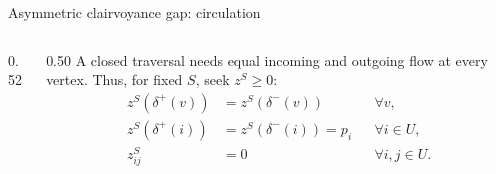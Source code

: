 \documentclass[aspectratio=169,12pt]{beamer}
\begin{document}
\begin{frame}{Asymmetric clairvoyance gap: circulation}
  \begin{columns}[c,onlytextwidth]
    \begin{column}{0.52\textwidth}
      \centering
      \resizebox{0.82\linewidth}{!}{\ThCirculationRelaxation}
    \end{column}
    \begin{column}{0.50\textwidth}
      \footnotesize
      A closed traversal needs equal incoming and outgoing flow at every
      vertex. Thus, for fixed \(S\), seek \(z^S\ge0\):
      \[
        \begin{aligned}
          z^S(\delta^+(v))&=z^S(\delta^-(v)) &&\forall v,\\[0.14cm]
          z^S(\delta^+(i))&=z^S(\delta^-(i))=p_i
            &&\forall i\in U,\\[0.14cm]
          z^S_{ij}&=0 &&\forall i,j\in U.
        \end{aligned}
      \]
    \end{column}
  \end{columns}

\end{frame}
\end{document}
